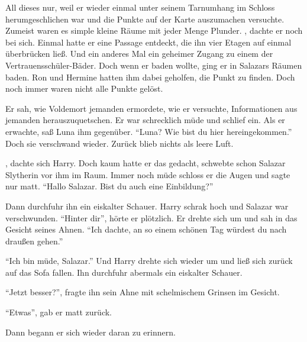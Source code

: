 \begin{rueckblick}
All dieses nur, weil er wieder einmal unter seinem Tarnumhang im Schloss herumgeschlichen war und die Punkte auf der Karte auszumachen versuchte. Zumeist waren es simple kleine Räume mit jeder Menge Plunder. , dachte er noch bei sich. Einmal hatte er eine Passage entdeckt, die ihn vier Etagen auf einmal überbrücken ließ. Und ein anderes Mal ein geheimer Zugang zu einem der Vertrauensschüler-Bäder. Doch wenn er baden wollte, ging er in Salazars Räumen baden. Ron und Hermine hatten ihm dabei geholfen, die Punkt zu finden. Doch noch immer waren nicht alle Punkte gelöst.
\end{rueckblick}

Er sah, wie Voldemort jemanden ermordete, wie er versuchte, Informationen aus jemanden herauszuquetschen. Er war schrecklich müde und schlief ein. Als er erwachte, saß Luna ihm gegenüber. \enquote{Luna? Wie bist du hier hereingekommen.} Doch sie verschwand wieder. Zurück blieb nichts als leere Luft.

, dachte sich Harry.  Doch kaum hatte er das gedacht, schwebte schon Salazar Slytherin vor ihm im Raum. Immer noch müde schloss er die Augen und sagte nur matt. \enquote{Hallo Salazar. Bist du auch eine Einbildung?}

Dann durchfuhr ihn ein eiskalter Schauer. Harry schrak hoch und Salazar war verschwunden. \enquote{Hinter dir}, hörte er plötzlich. Er drehte sich um und sah in das Gesicht seines Ahnen. \enquote{Ich dachte, an so einem schönen Tag würdest du nach draußen gehen.}

\enquote{Ich bin müde, Salazar.} Und Harry drehte sich wieder um und ließ sich zurück auf das Sofa fallen. Ihn durchfuhr abermals ein eiskalter Schauer.

\enquote{Jetzt besser?}, fragte ihn sein Ahne mit schelmischem Grinsen im Gesicht.

\enquote{Etwas}, gab er matt zurück.

Dann begann er sich wieder daran zu erinnern.

